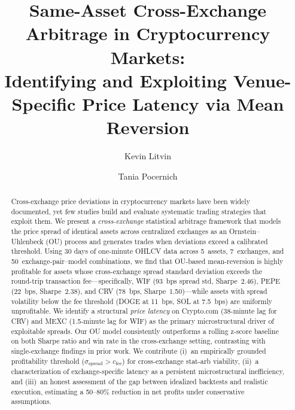 \documentclass[sigconf,nonacm=false]{acmart}
\begin{document}
\title{Same-Asset Cross-Exchange Arbitrage in Cryptocurrency Markets:\\Identifying and Exploiting Venue-Specific Price Latency via Mean Reversion}

\author{Kevin Litvin}

\author{Tania Pocernich}

\begin{abstract}
Cross-exchange price deviations in cryptocurrency markets have been widely documented, yet few studies build and evaluate systematic trading strategies that exploit them. We present a \emph{cross-exchange} statistical arbitrage framework that models the price spread of identical assets across centralized exchanges as an Ornstein--Uhlenbeck (OU) process and generates trades when deviations exceed a calibrated threshold. Using 30 days of one-minute OHLCV data across 5~assets, 7~exchanges, and 50~exchange-pair--model combinations, we find that OU-based mean-reversion is highly profitable for assets whose cross-exchange spread standard deviation exceeds the round-trip transaction fee---specifically, WIF (93~bps spread std, Sharpe~2.46), PEPE (22~bps, Sharpe~2.38), and CRV (78~bps, Sharpe~1.50)---while assets with spread volatility below the fee threshold (DOGE at 11~bps, SOL at 7.5~bps) are uniformly unprofitable. We identify a structural \emph{price latency} on Crypto.com (38-minute lag for CRV) and MEXC (1.5-minute lag for WIF) as the primary microstructural driver of exploitable spreads. Our OU model consistently outperforms a rolling z-score baseline on both Sharpe ratio and win rate in the cross-exchange setting, contrasting with single-exchange findings in prior work. We contribute (i)~an empirically grounded profitability threshold ($\sigma_{\text{spread}} > c_{\text{fee}}$) for cross-exchange stat-arb viability, (ii)~a characterization of exchange-specific latency as a persistent microstructural inefficiency, and (iii)~an honest assessment of the gap between idealized backtests and realistic execution, estimating a 50--80\% reduction in net profits under conservative assumptions.
\end{abstract}
\end{document}
